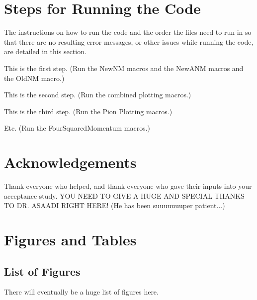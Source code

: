 \documentclass[11pt]{article}
\begin{document}
\section{Steps for Running the Code}
The instructions on how to run the code and the order the files need to run in so that there are no resulting error messages, or other issues while running the code, are detailed in this section.

\begin{adjustwidth}{4.0em}{0pt}
\begin{steps}
  \item This is the first step. (Run the NewNM macros and the NewANM macros and the OldNM macro.)
  \item This is the second step. (Run the combined plotting macros.)
  \item This is the third step. (Run the Pion Plotting macros.)
  \item Etc. (Run the FourSquaredMomentum macros.)
\end{steps}
\end{adjustwidth}



\section{Acknowledgements}
Thank everyone who helped, and thank everyone who gave their inputs into your acceptance study. YOU NEED TO GIVE A HUGE AND SPECIAL THANKS TO DR. ASAADI RIGHT HERE! (He has been suuuuuuuper patient...)



\section{Figures and Tables} \label{sec:FigTab}
\subsection{List of Figures}
There will eventually be a huge list of figures here.
\end{document}
